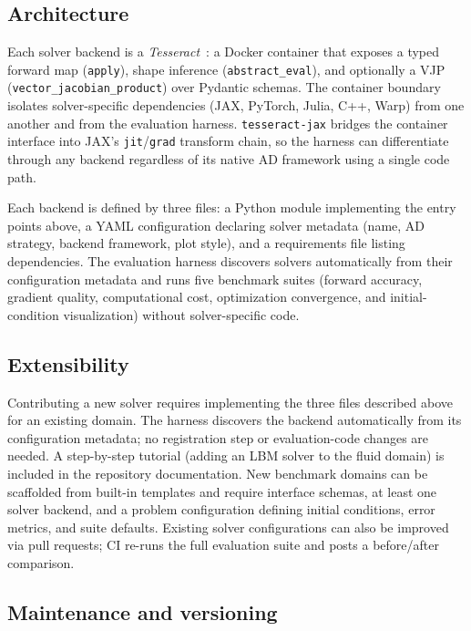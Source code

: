 \documentclass[11pt,a4paper]{article}
\begin{document}
\subsection{Architecture}

Each solver backend is a \emph{Tesseract}~\cite{haefner2025tesseract}: a
Docker container that exposes a typed forward map (\texttt{apply}), shape
inference (\texttt{abstract\_eval}), and optionally a VJP
(\texttt{vector\_jacobian\_product}) over Pydantic schemas. The container
boundary isolates solver-specific dependencies (JAX, PyTorch, Julia, C++,
Warp) from one another and from the evaluation harness.
\texttt{tesseract-jax} bridges the container interface into JAX's
\texttt{jit}/\texttt{grad} transform chain, so the harness can
differentiate through any backend regardless of its native AD framework
using a single code path.

Each backend is defined by three files: a Python module implementing the
entry points above, a YAML configuration declaring solver metadata (name,
AD strategy, backend framework, plot style), and a requirements file listing
dependencies. The evaluation harness discovers solvers automatically from
their configuration metadata and runs five benchmark suites (forward
accuracy, gradient quality, computational cost, optimization convergence,
and initial-condition visualization) without solver-specific code.

\subsection{Extensibility}

Contributing a new solver requires implementing the three files described
above for an existing domain. The harness discovers the backend
automatically from its configuration metadata; no registration step or
evaluation-code changes are needed. A step-by-step tutorial (adding an LBM
solver to the fluid domain) is included in the repository documentation.
New benchmark domains can be scaffolded from built-in templates and require
interface schemas, at least one solver backend, and a problem configuration
defining initial conditions, error metrics, and suite defaults. Existing
solver configurations can also be improved via pull requests; CI re-runs
the full evaluation suite and posts a before/after comparison.

\subsection{Maintenance and versioning}
\end{document}
